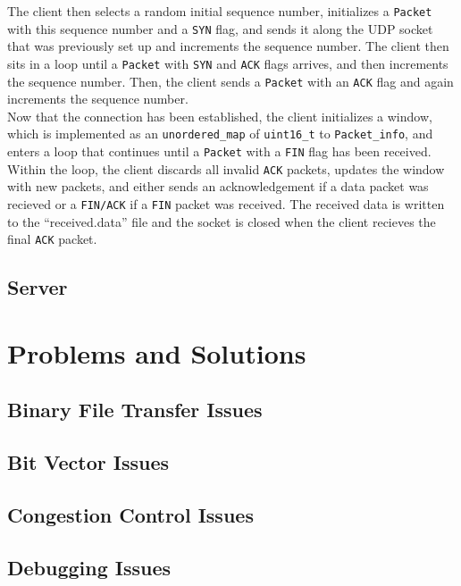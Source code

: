 \documentclass{article}
\begin{document}
\noindent
The client then selects a random initial sequence number, initializes a \texttt{Packet} with this sequence number and a \texttt{SYN} flag, and sends it along the UDP socket that was previously set up and increments the sequence number. The client then sits in a loop until a \texttt{Packet} with \texttt{SYN} and \texttt{ACK} flags arrives, and then increments the sequence number. Then, the client sends a \texttt{Packet} with an \texttt{ACK} flag and again increments the sequence number. \\

\noindent
Now that the connection has been established, the client initializes a window, which is implemented as an \texttt{unordered\_map} of \texttt{uint16\_t} to \texttt{Packet\_info}, and enters a loop that continues until a \texttt{Packet} with a \texttt{FIN} flag has been received. Within the loop, the client discards all invalid \texttt{ACK} packets, updates the window with new packets, and either sends an acknowledgement if a data packet was recieved or a \texttt{FIN/ACK} if a \texttt{FIN} packet was received. The received data is written to the ``received.data'' file and the socket is closed when the client recieves the final \texttt{ACK} packet.


\subsection{Server}

\section{Problems and Solutions}

\subsection{Binary File Transfer Issues}

\subsection{Bit Vector Issues}

\subsection{Congestion Control Issues}

\subsection{Debugging Issues}
\end{document}
